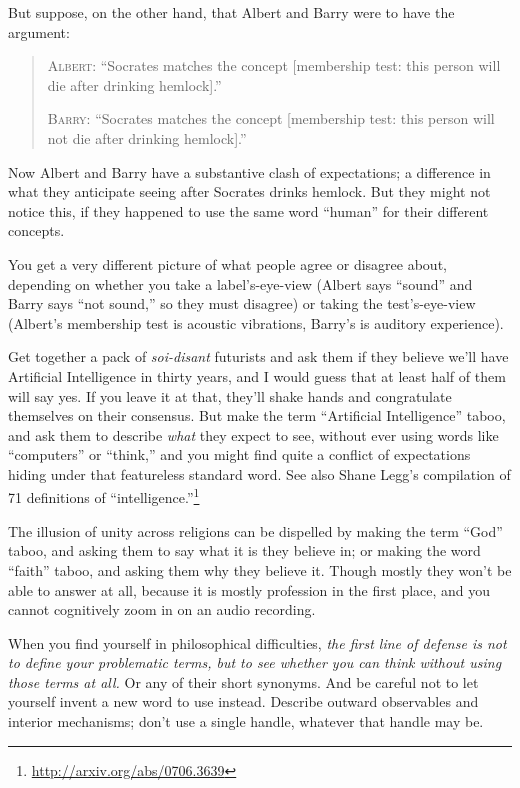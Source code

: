 { But suppose, on the other hand, that Albert and Barry were to have
the argument:

\begin{quotation}

 \textsc{Albert}: ``Socrates matches the concept
[membership test: this person will die after drinking
hemlock].''

{
 \textsc{Barry}: ``Socrates matches the concept [membership
test: this person will not die after drinking
hemlock].''}
\end{quotation}


 Now Albert and Barry have a substantive clash of expectations; a
difference in what they anticipate seeing after Socrates drinks
hemlock. But they might not notice this, if they happened to use the
same word ``human'' for their
different concepts.


 You get a very different picture of what people agree or disagree
about, depending on whether you take a label's-eye-view
(Albert says ``sound'' and Barry
says ``not sound,'' so they must
disagree) or taking the test's-eye-view
(Albert's membership test is acoustic vibrations,
Barry's is auditory experience).


 Get together a pack of \textit{soi-disant} futurists and ask them
if they believe we'll have Artificial Intelligence in
thirty years, and I would guess that at least half of them will say
yes. If you leave it at that, they'll shake hands and
congratulate themselves on their consensus. But make the term
``Artificial Intelligence'' taboo,
and ask them to describe \textit{what} they expect to see, without ever
using words like ``computers'' or
``think,'' and you might find quite
a conflict of expectations hiding under that featureless standard word.
See also Shane Legg's compilation of 71 definitions of
``intelligence.''\footnote{\url{http://arxiv.org/abs/0706.3639}}


 The illusion of unity across religions can be dispelled by making
the term ``God'' taboo, and asking
them to say what it is they believe in; or making the word
``faith'' taboo, and asking them why
they believe it. Though mostly they won't be able to
answer at all, because it is mostly profession in the first place, and
you cannot cognitively zoom in on an audio recording.


 When you find yourself in philosophical difficulties, \textit{the
first line of defense is not to define your problematic terms, but to
see whether you can think without using those terms at all.} Or any of
their short synonyms. And be careful not to let yourself invent a new
word to use instead. Describe outward observables and interior
mechanisms; don't use a single handle, whatever that
handle may be.


}
